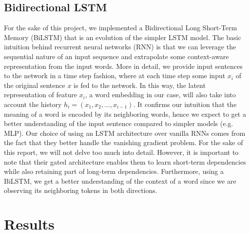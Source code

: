 \documentclass[11pt,a4paper]{article}
\begin{document}
\subsection{Bidirectional LSTM}

For the sake of this project, we implemented a Bidirectional Long Short-Term Memory (BiLSTM) that is an evolution of the simpler LSTM model. The basic intuition behind recurrent neural networks (RNN) is that we can leverage the sequential nature of an input sequence and extrapolate some context-aware representation from the input words. More in detail, we provide input sentences to the network in a time step fashion, where at each time step some input $x_i$ of the original sentence $x$ is fed to the network. In this way, the latent representation of feature $x_i$, a word embedding in our case, will also take into account the history $h_i=(x_1, x_2, ..., x_{i-1})$. It confirms our intuition that the meaning of a word is encoded by its neighboring words, hence we expect to get a better understanding of the input sentence compared to simpler models (e.g. MLP). Our choice of using an LSTM architecture over vanilla RNNs comes from the fact that they better handle the vanishing gradient problem. For the sake of this report, we will not delve too much into detail. However, it is important to note that their gated architecture enables them to learn short-term dependencies while also retaining part of long-term dependencies. Furthermore, using a BiLSTM, we get a better understanding of the context of a word since we are observing its neighboring tokens in both directions.

\section{Results}
\end{document}
